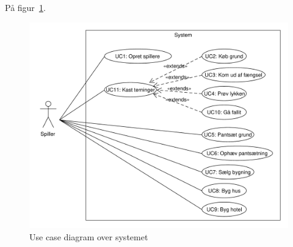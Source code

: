 \documentclass[class=article, crop=false]{standalone}
\begin{document}
    På figur~\ref{fig:use_case_model}.

    \begin{figure}[H]
        \centering

        \includegraphics[scale=0.7]{diagrams/use_case_diagram.pdf}
        \caption{Use case diagram over systemet}\label{fig:use_case_model}
    \end{figure}
\end{document}
